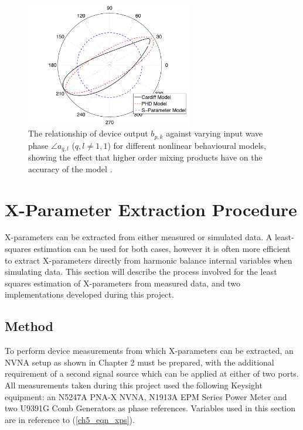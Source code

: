 \documentclass[../thesis/thesis.tex]{subfiles}
\begin{document}
\begin{figure}
	\centering
	\includegraphics[width=0.65\textwidth]{phasedep}
	\caption[Relationship of device output against input wave phase for different nonlinear behavioural models.]{The relationship of device output $b_{p,k}$ against varying input wave phase $\angle a_{q,l}$ ($q, l \ne 1, 1$) for different nonlinear behavioural models, showing the effect that higher order mixing products have on the accuracy of the model \cite{Bespalko_2016}.}
	\label{ch5_fig_phasedep}
\end{figure}

\section{X-Parameter Extraction Procedure}

X-parameters can be extracted from either measured or simulated data. A least-squares estimation can be used for both cases, however it is often more efficient to extract X-parameters directly from harmonic balance internal variables when simulating data. This section will describe the process involved for the least squares estimation of X-parameters from measured data, and two implementations developed during this project.

\subsection{Method}

To perform device measurements from which X-parameters can be extracted, an NVNA setup as shown in Chapter 2 must be prepared, with the additional requirement of a second signal source which can be applied at either of two ports. All measurements taken during this project used the following Keysight equipment: an N5247A PNA-X NVNA, N1913A EPM Series Power Meter and two U9391G Comb Generators as phase references. Variables used in this section are in reference to (\ref{ch5_eqn_xps}).
\end{document}
